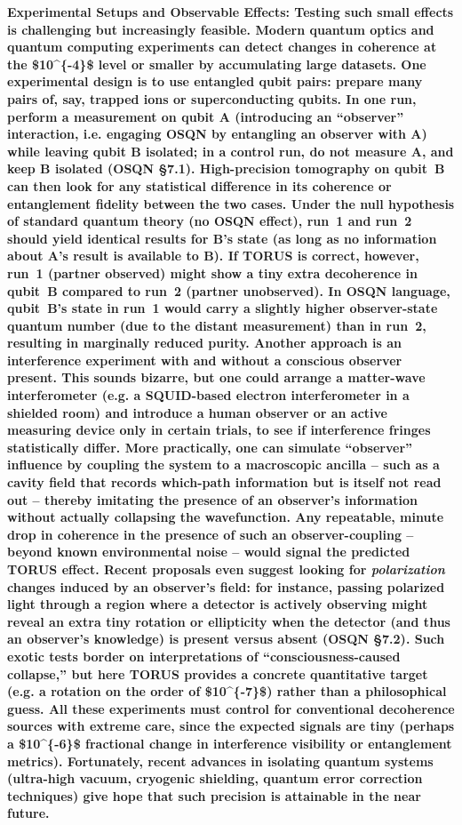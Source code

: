 \documentclass[
]{article}
\begin{document}
\textbf{Experimental Setups and Observable Effects: Testing such small
effects is challenging but increasingly feasible. Modern quantum optics
and quantum computing experiments can detect changes in coherence at the
\$10\^{}\{-4\}\$ level or smaller by accumulating large datasets. One
experimental design is to use entangled qubit pairs: prepare many pairs
of, say, trapped ions or superconducting qubits. In one run, perform a
measurement on qubit A (introducing an ``observer'' interaction, i.e.
engaging OSQN by entangling an observer with A) while leaving qubit B
isolated; in a control run, do not measure A, and keep B isolated (OSQN
§7.1). High-precision tomography on qubit~B can then look for any
statistical difference in its coherence or entanglement fidelity between
the two cases. Under the null hypothesis of standard quantum theory (no
OSQN effect), run~1 and run~2 should yield identical results for B's
state (as long as no information about A's result is available to B). If
TORUS is correct, however, run~1 (partner observed) might show a tiny
extra decoherence in qubit~B compared to run~2 (partner unobserved). In
OSQN language, qubit~B's state in run~1 would carry a slightly higher
observer-state quantum number (due to the distant measurement) than in
run~2, resulting in marginally reduced purity. Another approach is an
interference experiment with and without a conscious observer present.
This sounds bizarre, but one could arrange a matter-wave interferometer
(e.g. a SQUID-based electron interferometer in a shielded room) and
introduce a human observer or an active measuring device only in certain
trials, to see if interference fringes statistically differ. More
practically, one can simulate ``observer'' influence by coupling the
system to a macroscopic ancilla -- such as a cavity field that records
which-path information but is itself not read out -- thereby imitating
the presence of an observer's information without actually collapsing
the wavefunction. Any repeatable, minute drop in coherence in the
presence of such an observer-coupling -- beyond known environmental
noise -- would signal the predicted TORUS effect. Recent proposals even
suggest looking for \emph{polarization} changes induced by an observer's
field: for instance, passing polarized light through a region where a
detector is actively observing might reveal an extra tiny rotation or
ellipticity when the detector (and thus an observer's knowledge) is
present versus absent (OSQN §7.2). Such exotic tests border on
interpretations of ``consciousness-caused collapse,'' but here TORUS
provides a concrete quantitative target (e.g. a rotation on the order of
\$10\^{}\{-7\}\$) rather than a philosophical guess. All these
experiments must control for conventional decoherence sources with
extreme care, since the expected signals are tiny (perhaps a
\$10\^{}\{-6\}\$ fractional change in interference visibility or
entanglement metrics). Fortunately, recent advances in isolating quantum
systems (ultra-high vacuum, cryogenic shielding, quantum error
correction techniques) give hope that such precision is attainable in
the near future.}
\end{document}
